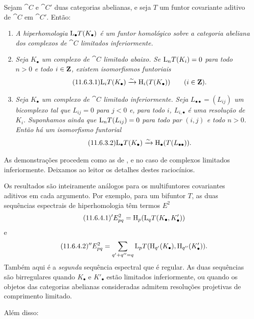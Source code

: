 \begin{proposition}[11.6.3]
\label{0.11.6.3}
Sejam $\cat{C}$ e $\cat{C}'$ duas categorias abelianas, e seja $T$ um funtor covariante aditivo de $\cat{C}$ em $\cat{C}'$.
Então:
\begin{enumerate}
  \item[{\rm(i) }] \emph{A hiperhomologia $\mathrm{L}_\bullet T(K_\bullet)$ é um funtor homológico sobre a categoria abeliana dos complexos de $\cat{C}$ limitados inferiormente.}

  \item[{\rm(ii) }] \emph{Seja $K_\bullet$ um complexo de $\cat{C}$ limitado abaixo.
  Se $\mathrm{L}_nT(K_i)=0$ para todo $n>0$ e todo $i\in\mathbf{Z}$, existem isomorfismos funtoriais}
  \[
  \label{0.11.6.3.1}
  \tag{11.6.3.1}
    \LL_iT(K_\bullet)
    \simto
    \HH_i(T(K_\bullet))
    \qquad(i\in\bb{Z}).
  \]

  \item[{\rm(iii) }] \emph{Seja $K_\bullet$ um complexo de $\cat{C}$ limitado inferiormente.
  Seja $L_{\bullet\bullet}=(L_{ij})$ um bicomplexo tal que $L_{ij}=0$ para $j<0$ e, para todo $i$, $L_{i,\bullet}$ é uma resolução de $K_i$.
  Suponhamos ainda que $\mathrm{L}_nT(L_{ij})=0$ para todo par $(i,j)$ e todo $n>0$.
  Então há um isomorfismo funtorial}
  \[
  \label{0.11.6.3.2}
  \tag{11.6.3.2}
    \LL_\bullet T(K_\bullet)
    \simto
    \HH_\bullet(T(L_{\bullet\bullet})).
  \]
\end{enumerate}

As demonstrações procedem como as de ,  e  no caso de complexos limitados inferiormente.
Deixamos ao leitor os detalhes destes raciocínios.
\end{proposition}

\begin{env}[11.6.4]
\label{0.11.6.4}
Os resultados são inteiramente análogos para os multifuntores covariantes aditivos em cada argumento.
Por exemplo, para um bifuntor $T$, as duas sequências espectrais de hiperhomologia têm termos $E^2$
\[
\label{0.11.6.4.1}
\tag{11.6.4.1}
  {}'E^2_{pq}
  =\HH_p(\LL_qT(K_\bullet,K'_\bullet))
\]
e
\[
\label{0.11.6.4.2}
\tag{11.6.4.2}
  {}''E^2_{pq}
  =
  \sum_{q'+q''=q}
  \LL_pT(\HH_{q'}(K_\bullet),\HH_{q''}(K'_\bullet)).
\]
Também aqui é a \emph{segunda} sequência espectral que é regular.
As duas sequências são birregulares quando $K_\bullet$ e $K'_\bullet$ estão limitados inferiormente, ou quando os objetos das categorias abelianas consideradas admitem resoluções projetivas de comprimento limitado.

Além disso:
\end{env}

